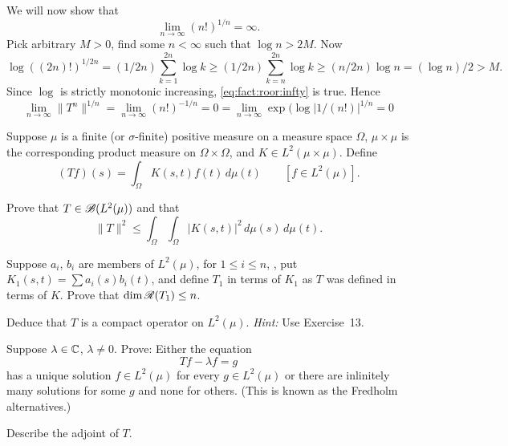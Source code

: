 \begin{enumerate}
We will now show that 
\begin{equation} \label{eq:fact:roor:infty}
\lim_{n\to\infty} (n!)^{1/n} = \infty.
\end{equation}
Pick arbitrary \(M>0\), find some \(n<\infty\) such that \(\log n > 2M\).
Now
\begin{equation*}
\log ((2n)!)^{1/2n}
= (1/2n)\sum_{k=1}^{2n} \log k
\geq (1/2n)\sum_{k=n}^{2n} \log k
\geq (n/2n) \log n
= (\log n)/2 > M.
\end{equation*}
Since \(\log\) is strictly monotonic increasing, \eqref{eq:fact:roor:infty}
is true.
Hence
\begin{equation*}
\lim_{n\to\infty} \|T^n\|^{1/n}
= \lim_{n\to\infty} (n!)^{-1/n} = 0
= \lim_{n\to\infty} \exp(\log|1/(n!)|^{1/n} = 0
\end{equation*}


\begin{excopy}
Suppose \(\mu\) is a finite (or \(\sigma\)-finite) positive measure
on a measure space \(\Omega\), \(\mu\times\mu\) is the
corresponding product measure on \(\Omega\times\Omega\),
 and \(K \in L^2(\mu\times\mu)\). Define
\begin{equation*}
(Tf)(s) = \int_\Omega K(s,t)f(t)\,d\mu(t) \qquad [f \in L^2(\mu)].
\end{equation*}
\begin{itemize}
Prove that \(T \in \mathscr{B}(L^2(\mu))\) and that
\begin{equation*}
\|T\|^2 \leq \int_\Omega\int_\Omega |K(s,t)|^2\,d\mu(s)\,d\mu(t).
\end{equation*}

Suppose \(a_i\), \(b_i\) are members of \(L^2(\mu)\), for \(1 \leq i \leq n\),
 , put \(K_1(s,t) = \sum a_i(s)b_i(t)\), and
define \(T_1\) in terms of \(K_1\) as $T$ was defined in terms of $K$.
 Prove that \(\dim \mathscr{R}(T_1) \leq n\).

Deduce that $T$ is a compact operator on \(L^2(\mu)\).
\emph{Hint:} Use Exercise~13.

Suppose \(\lambda \in \mathbb{C}\), \(\lambda \neq 0\). Prove: Either the equation
\begin{equation*}
Tf - \lambda f = g
\end{equation*}
has a unique solution \(f \in L^2(\mu)\) for every \(g \in L^2(\mu)\)
 or there are inlinitely many
solutions for some $g$ and none for others.
 (This is known as the 
Fredholm alternatives.)

Describe the adjoint of $T$.
\end{itemize}
\end{excopy}


\end{enumerate}
